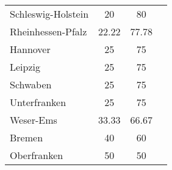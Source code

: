 \begin{table}[H]
\begin{tabularx}{\textwidth}{Xccc}
            Schleswig-Holstein & 20 & 80 \\
            Rheinhessen-Pfalz & 22.22 & 77.78 \\
            Hannover & 25 & 75 \\
            Leipzig & 25 & 75 \\
            Schwaben & 25 & 75 \\
            Unterfranken & 25 & 75 \\
            Weser-Ems & 33.33 & 66.67 \\
            Bremen & 40 & 60 \\
            Oberfranken & 50 & 50 \\
        \bottomrule
    \end{tabularx}
\end{table}
        